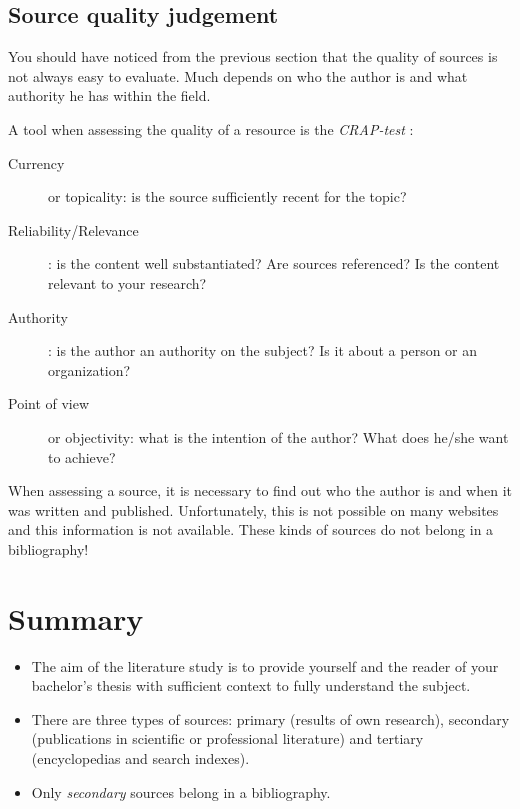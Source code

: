 \subsection{Source quality judgement}
\label{sub:sourcequalityjudgement}

You should have noticed from the previous section that the quality of sources is not always easy to evaluate. Much depends on who the author is and what authority he has within the field.

A tool when assessing the quality of a resource is the \emph{CRAP-test} \autocite{Gratz2015}:

\begin{description}
   \item[Currency] or topicality: is the source sufficiently recent for the topic?
      \item[Reliability/Relevance]: is the content well substantiated? Are sources referenced? Is the content relevant to your research?
      \item[Authority]: is the author an authority on the subject? Is it about a person or an organization?
   \item[Point of view] or objectivity: what is the intention of the author? What does he/she want to achieve?
\end{description}

When assessing a source, it is necessary to find out who the author is and when it was written and published. Unfortunately, this is not possible on many websites and this information is not available. These kinds of sources do not belong in a bibliography!

\section{Summary}
\label{sec:literatureresearchsummary}

\begin{itemize}
   \item The aim of the literature study is to provide yourself and the reader of your bachelor's thesis with sufficient context to fully understand the subject.
   \item There are three types of sources: primary (results of own research), secondary (publications in scientific or professional literature) and tertiary (encyclopedias and search indexes).
   \item Only \emph{secondary} sources belong in a bibliography.
\end{itemize}
